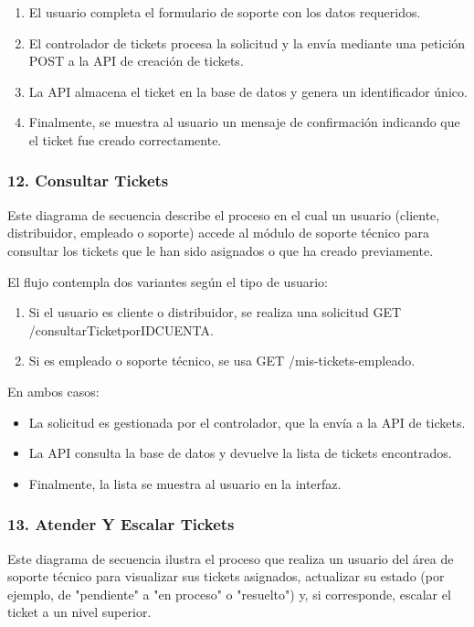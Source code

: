 \begin{enumerate}
    \item El usuario completa el formulario de soporte con los datos requeridos.
    \item El controlador de tickets procesa la solicitud y la envía mediante una petición POST a la API de creación de tickets.
    \item La API almacena el ticket en la base de datos y genera un identificador único.
    \item Finalmente, se muestra al usuario un mensaje de confirmación indicando que el ticket fue creado correctamente.
\end{enumerate}

\subsubsection*{12. Consultar Tickets}
Este diagrama de secuencia describe el proceso en el cual un usuario (cliente, distribuidor, empleado o soporte) accede al módulo de soporte técnico para consultar los tickets que le han sido asignados o que ha creado previamente.

El flujo contempla dos variantes según el tipo de usuario:

\begin{enumerate}
    \item Si el usuario es cliente o distribuidor, se realiza una solicitud GET /consultarTicketporIDCUENTA.
    \item Si es empleado o soporte técnico, se usa GET /mis-tickets-empleado.
\end{enumerate}

En ambos casos:

\begin{itemize}
    \item La solicitud es gestionada por el controlador, que la envía a la API de tickets.
    \item La API consulta la base de datos y devuelve la lista de tickets encontrados.
    \item Finalmente, la lista se muestra al usuario en la interfaz.
\end{itemize}

\subsubsection*{13. Atender Y Escalar Tickets}

Este diagrama de secuencia ilustra el proceso que realiza un usuario del área de soporte técnico para visualizar sus tickets asignados, actualizar su estado (por ejemplo, de "pendiente" a "en proceso" o "resuelto") y, si corresponde, escalar el ticket a un nivel superior.

